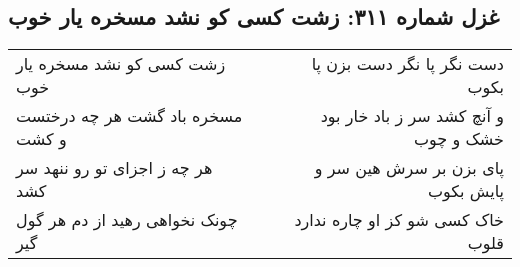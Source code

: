 \begin{center}
\section*{غزل شماره ۳۱۱: زشت کسی کو نشد مسخره یار خوب}
\label{sec:0311}
\begin{longtable}{l p{0.5cm} r}
زشت کسی کو نشد مسخره یار خوب
&&
دست نگر پا نگر دست بزن پا بکوب
\\
مسخره باد گشت هر چه درختست و کشت
&&
و آنچ کشد سر ز باد خار بود خشک و چوب
\\
هر چه ز اجزای تو رو ننهد سر کشد
&&
پای بزن بر سرش هین سر و پایش بکوب
\\
چونک نخواهی رهید از دم هر گول گیر
&&
خاک کسی شو کز او چاره ندارد قلوب
\\
\end{longtable}
\end{center}
